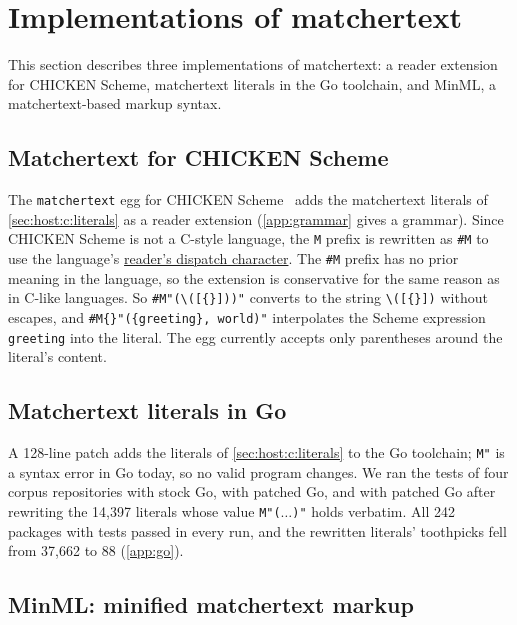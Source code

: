 \section{Implementations of matchertext}
\label{sec:impl}

This section describes three implementations of matchertext:
a reader extension for CHICKEN Scheme,
matchertext literals in the Go toolchain,
and MinML, a matchertext-based markup syntax.

\subsection{Matchertext for CHICKEN Scheme}

The \texttt{matchertext} egg
for CHICKEN Scheme~\cite{chicken26scheme}
adds the matchertext literals of \cref{sec:host:c:literals}
as a reader extension (\cref{app:grammar} gives a grammar).
Since CHICKEN Scheme is not a C-style language, the \verb|M| prefix
is rewritten as \verb|#M| to use the language's
\href{https://wiki.call-cc.org/man/6/Module%20(chicken%20read-syntax)}{reader's dispatch character}.
The \verb|#M| prefix has no prior meaning in the language,
so the extension is conservative for the same reason as in C-like languages.
So \verb|#M"(\([{}]))"| converts to the string \verb|\([{}])| without escapes,
and \verb|#M{}"({greeting}, world)"| interpolates the Scheme expression
\verb|greeting| into the literal.
The egg currently accepts only parentheses around the literal's content.

\subsection{Matchertext literals in Go}
\label{sec:impl:go}

A 128-line patch adds the literals of \cref{sec:host:c:literals} to the Go toolchain;
\verb|M"| is a syntax error in Go today, so no valid program changes.
We ran the tests of four corpus repositories with stock Go, with patched Go,
and with patched Go after rewriting the 14{,}397 literals whose value \verb|M"(|$\dots$\verb|)"| holds verbatim.
All 242 packages with tests passed in every run,
and the rewritten literals' toothpicks fell from 37{,}662 to 88 (\cref{app:go}).

\subsection{MinML: minified matchertext markup}

